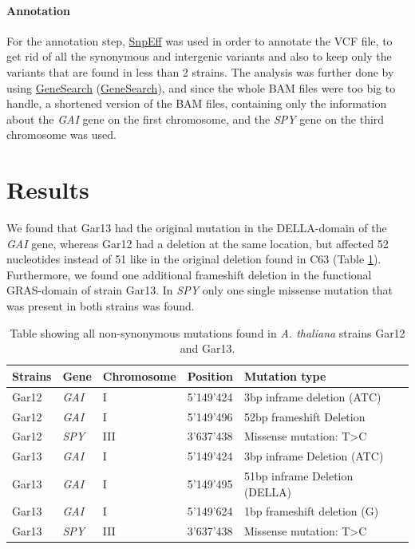 \documentclass[10pt,a4paper]{article}
\begin{document}
\paragraph{Annotation}
For the annotation step, \href{http://snpeff.sourceforge.net/}{SnpEff} was used in order to annotate the VCF file, to get rid of all the synonymous and intergenic variants and also to keep only the variants that are found in less than 2 strains. The analysis was further done by using \href{http://www.phenosystems.com/www/index.php/products/gensearchngs}{GeneSearch} (\href{http://www.phenosystems.com/www/}{GeneSearch}), and since the whole BAM files were too big to handle, a shortened version of the BAM files, containing only the information about the \textit{GAI} gene on the first chromosome, and the \textit{SPY} gene on the third chromosome was used.


\section*{\large Results}

We found that Gar13 had the original mutation in the DELLA-domain of the \textit{GAI} gene, whereas Gar12 had a deletion at the same location, but affected 52 nucleotides instead of 51 like in the original deletion found in C63 (Table \ref{tab:resultATH}). Furthermore, we found one additional frameshift deletion in the functional GRAS-domain of strain Gar13. In \textit{SPY} only one single missense mutation that was present in both strains was found. 


\begin{table}[h]
	\centering
	
		\begin{tabular}{|l|l|l|l|l|}
			\hline
			\textbf{Strains} & \textbf{Gene} & \textbf{Chromosome} & \textbf{Position} & \textbf{Mutation type} \\ \hline
			Gar12 & \textit{GAI} & I & 5'149’424 & 3bp inframe deletion (ATC) \\ \hline
			Gar12 & \textit{GAI} & I & 5'149’496 & 52bp frameshift Deletion \\ \hline
			Gar12 & \textit{SPY} & III & 3'637’438 & Missense mutation: T\textgreater{}C \\ \hline
			Gar13 & \textit{GAI} & I & 5'149’424 & 3bp inframe Deletion (ATC) \\ \hline
			Gar13 & \textit{GAI} & I & 5'149’495 & 51bp inframe Deletion (DELLA) \\ \hline
			Gar13 & \textit{GAI} & I & 5'149’624 & 1bp frameshift deletion (G) \\ \hline
			Gar13 & \textit{SPY} & III & 3'637’438 & Missense mutation: T\textgreater{}C \\ \hline
		\end{tabular}
	\caption{Table showing all non-synonymous mutations found in \textit{A. thaliana} strains Gar12 and Gar13.}
	\label{tab:resultATH}
\end{table}
\end{document}
